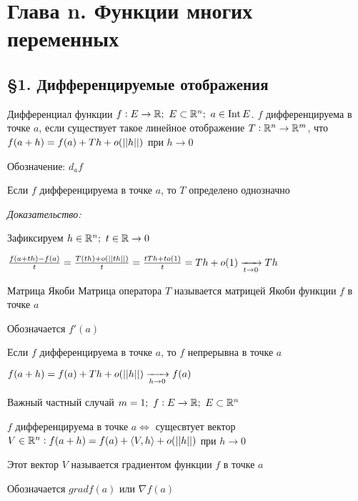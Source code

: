 \documentclass[12pt]{article}
\begin{document}
\section{Глава n. Функции многих переменных}

\subsection{\S 1. Дифференцируемые отображения}

\begin{defin}{Дифференциал функции}
    $f : E \to \mathbb R;\ E \subset{\mathbb R^n};\ a \in \operatorname{Int}{E}$. $f$ дифференцируема в точке $a$, если существует такое линейное отображение $T : \mathbb R^n \to \mathbb R^m$, что $f(a + h) = f(a) + Th + o(|| h ||)$ при $h \to 0$

    Обозначение: $d_af$
\end{defin}

\begin{Remark}{}
    Если $f$ дифференцируема в точке $a$, то $T$ определено однозначно
\end{Remark}

\textit{Доказательство:}

Зафиксируем $h \in \mathbb R^n;\ t \in \mathbb R \to 0$

$\frac{f(a + th) - f(a)}{t} = \frac{T(th) + o(|| th ||)}{t} = \frac{tTh + to(1)}{t} = Th + o(1) \xrightarrow[t \to 0]{} Th$

\begin{defin}{Матрица Якоби}
    Матрица оператора $T$ называется матрицей Якоби функции $f$ в точке $a$

    Обозначается $f'(a)$
\end{defin}

\begin{Remark}{}
    Если $f$ дифференцируема в точке $a$, то $f$ непрерывна в точке $a$

    $f(a + h) = f(a) + Th + o(|| h ||) \xrightarrow[h \to 0]{} f(a)$
\end{Remark}

\begin{Example}{Важный частный случай}
    $m = 1;\ f : E \to \R;\ E \subset \R^n$

    $f$ дифференцируема в точке $a \Leftrightarrow$ сущесвтует вектор $V \in \mathbb R^n : f(a + h) = f(a) + \langle V, h \rangle + o(|| h ||)$ при $h \to 0$
\end{Example}

\begin{defin}{}
    Этот вектор $V$ называется градиентом функции $f$ в точке $a$

    Обозначается $grad f(a)$ или $\nabla f(a)$
\end{defin}
\end{document}
